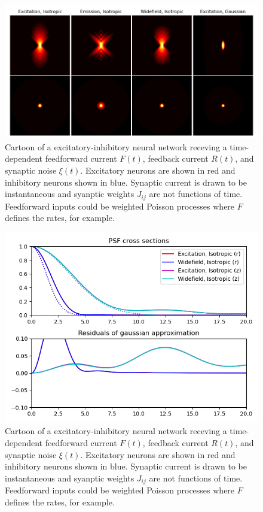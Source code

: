 \documentclass{ucetd}
\begin{document}
\begin{figure}[t!]
\centering
\includegraphics[width=150mm]{psf-1}
\caption{Cartoon of a excitatory-inhibitory neural network receving a time-dependent feedforward current $F(t)$, feedback current $R(t)$, and synaptic noise $\xi(t)$. Excitatory neurons are shown in red and inhibitory neurons shown in blue. Synaptic current is drawn to be instantaneous and syanptic weights $J_{ij}$ are not functions of time. Feedforward inputs could be weighted Poisson processes where $F$ defines the rates, for example.}
\end{figure}

\begin{figure}[t!]
\centering
\includegraphics[width=150mm]{psf-2}
\caption{Cartoon of a excitatory-inhibitory neural network receving a time-dependent feedforward current $F(t)$, feedback current $R(t)$, and synaptic noise $\xi(t)$. Excitatory neurons are shown in red and inhibitory neurons shown in blue. Synaptic current is drawn to be instantaneous and syanptic weights $J_{ij}$ are not functions of time. Feedforward inputs could be weighted Poisson processes where $F$ defines the rates, for example.}
\end{figure}
\end{document}
